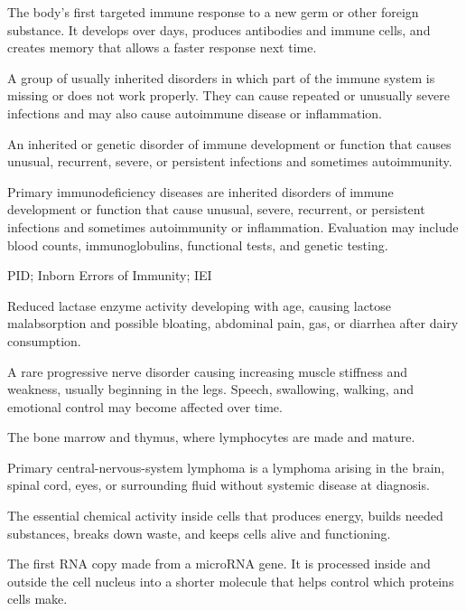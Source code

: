  The body’s first targeted immune response to a new germ or other foreign substance. It develops over days, produces antibodies and immune cells, and creates memory that allows a faster response next time.

 A group of usually inherited disorders in which part of the immune system is missing or does not work properly. They can cause repeated or unusually severe infections and may also cause autoimmune disease or inflammation.

 An inherited or genetic disorder of immune development or function that causes unusual, recurrent, severe, or persistent infections and sometimes autoimmunity.

 Primary immunodeficiency diseases are inherited disorders of immune development or function that cause unusual, severe, recurrent, or persistent infections and sometimes autoimmunity or inflammation. Evaluation may include blood counts, immunoglobulins, functional tests, and genetic testing.

\synonyms
PID; Inborn Errors of Immunity; IEI

 Reduced lactase enzyme activity developing with age, causing lactose malabsorption and possible bloating, abdominal pain, gas, or diarrhea after dairy consumption.

 A rare progressive nerve disorder causing increasing muscle stiffness and weakness, usually beginning in the legs. Speech, swallowing, walking, and emotional control may become affected over time.

 The bone marrow and thymus, where lymphocytes are made and mature.

 Primary central-nervous-system lymphoma is a lymphoma arising in the brain, spinal cord, eyes, or surrounding fluid without systemic disease at diagnosis.

 The essential chemical activity inside cells that produces energy, builds needed substances, breaks down waste, and keeps cells alive and functioning.

 The first RNA copy made from a microRNA gene. It is processed inside and outside the cell nucleus into a shorter molecule that helps control which proteins cells make.

